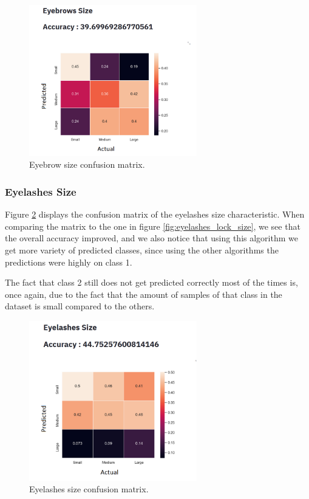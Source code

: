 \documentclass[12pt,a4paper,oneside]{memoir}
\begin{document}
\begin{figure}[H]
\centering
\includegraphics[width=0.65\textwidth]{images/eyebrows_star_size.png}
\caption{Eyebrow size confusion matrix.}
\centering
\label{fig:eybrows_star_size}
\end{figure}


\subsubsection{Eyelashes Size}
Figure \ref{fig:eyelashes_star_size} displays the confusion matrix of the eyelashes size characteristic. When comparing the matrix to the one in figure \ref{fig:eyelashes_lock_size}, we see that the overall accuracy improved, and we also notice that using this algorithm we get more variety of predicted classes, since using the other algorithms the predictions were highly on class 1.  

\par


The fact that class 2 still does not get predicted correctly most of the times is, once again, due to the fact that the amount of samples of that class in the dataset is small compared to the others.

\begin{figure}[H]
\centering
\includegraphics[width=0.65\textwidth]{images/eyelashes_star_size.png}
\caption{Eyelashes size confusion matrix.}
\centering
\label{fig:eyelashes_star_size}
\end{figure}
\end{document}
